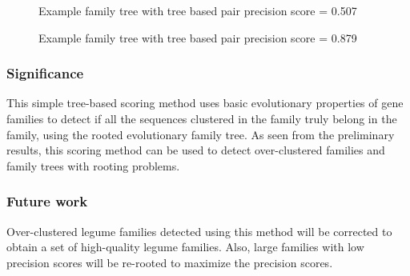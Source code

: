 \documentclass{article}
\begin{document}
		\begin{figure}[h!]
			\caption{Example family tree with tree based pair precision score = 0.507}
			\label{fig:tree_based_quality_type2_L_4L11VC}
		\end{figure}
		
		\begin{figure}[h!]
			\caption{Example family tree with tree based pair precision score = 0.879}
			\label{fig:tree_based_quality_type3_L_4VWLVV}
		\end{figure}
		
		\subsubsection{Significance}
		This simple tree-based scoring method uses basic evolutionary properties of gene families to detect if all the sequences clustered in the family truly belong in the family, using the rooted evolutionary family tree. As seen from the preliminary results, this scoring method can be used to detect over-clustered families and family trees with rooting problems.
		
		
		\subsubsection{Future work}
		Over-clustered legume families detected using this method will be corrected to obtain a set of high-quality legume families. Also, large families with low precision scores will be re-rooted to maximize the precision scores.
		
\end{document}
